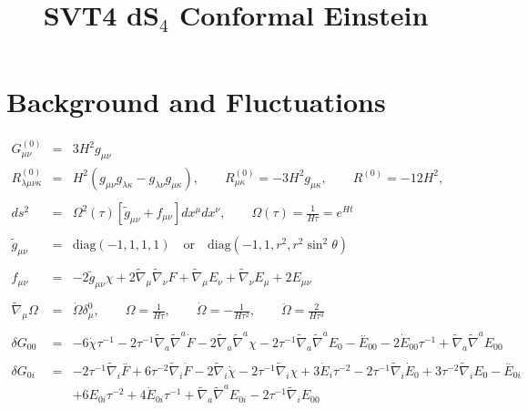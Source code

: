 \documentclass[10pt,letterpaper]{article}
\title{SVT4 dS${}_4$ Conformal Einstein}
\date{}
\numberwithin{equation}{section}
\begin{document}
 
\maketitle
\noindent 
\section{Background and Fluctuations}
\begin{eqnarray}
G^{(0)}_{\mu\nu} &=& 3H^{2} g_{\mu\nu}
\\
R^{(0)}_{\lambda\mu\nu\kappa} &=& H^{2} (g_{\mu\nu}g_{\lambda\kappa}-g_{\lambda\nu}g_{\mu\kappa}),
\qquad
R^{(0)}_{\mu\kappa} = -3 H^{2} g_{\mu\kappa},
\qquad
R^{(0)}= -12 H^{2},
\\ \nonumber\\
ds^2 &=& \Omega^2(\tau)[\tilde g_{\mu\nu}+ f_{\mu\nu}] dx^\mu dx^\nu,\qquad
\Omega(\tau) = \frac{1}{H\tau} = e^{Ht}
\label{geom}
\\ \nonumber\\
\tilde g_{\mu\nu} &=& \text{diag}(-1,1,1,1)\quad\text{or}\quad \text{diag}(-1,1,r^2,r^2\sin^2\theta)
\\ \nonumber\\
f_{\mu\nu} &=& -2\tilde g_{\mu\nu} \chi + 2\tilde\nabla_\mu\tilde\nabla_\nu F + \tilde\nabla_\mu E_\nu + \tilde\nabla_\nu E_\mu + 2E_{\mu\nu}
\label{svt}
\\ \nonumber\\
\tilde\nabla_\mu \Omega &=&  \dot\Omega \delta^0_\mu ,\qquad \Omega = \frac{1}{H\tau},
\qquad \dot \Omega = -\frac{1}{H\tau^2},\qquad \ddot\Omega = \frac{2}{H\tau^3}
\\ \nonumber\\
\delta G_{00}&=& -6 \dot{\chi} \tau^{-1} - 2 \tau^{-1} \tilde{\nabla}_{a}\tilde{\nabla}^{a}\dot{F} - 2 \tilde{\nabla}_{a}\tilde{\nabla}^{a}\chi -2 \tau^{-1} \tilde{\nabla}_{a}\tilde{\nabla}^{a}E_{0}{}- \overset{..}{E}_{00}{} - 2 \dot{E}_{00}{} \tau^{-1} + \tilde{\nabla}_{a}\tilde{\nabla}^{a}E_{00}{}
\\  \nonumber\\ 
\delta G_{0i}&=& -2 \tau^{-1} \tilde{\nabla}_{i}\overset{..}{F} + 6 \tau^{-2} \tilde{\nabla}_{i}\dot{F} - 2 \tilde{\nabla}_{i}\dot{\chi} - 2 \tau^{-1} \tilde{\nabla}_{i}\chi +3 \dot{E}_{i} \tau^{-2} - 2 \tau^{-1} \tilde{\nabla}_{i}\dot{E}_{0}{} + 3 \tau^{-2} \tilde{\nabla}_{i}E_{0}{}- \overset{..}{E}_{0i}{} \nonumber \\ 
&& + 6 E_{0i}{} \tau^{-2} + 4 \dot{E}_{0i}{} \tau^{-1} + \tilde{\nabla}_{a}\tilde{\nabla}^{a}E_{0i}{} - 2 \tau^{-1} \tilde{\nabla}_{i}E_{00}{}

\end{eqnarray}
\end{document}
